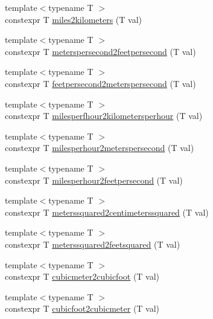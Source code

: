 \begin{DoxyCompactItemize}
\item 
{\footnotesize template$<$typename T $>$ }\\constexpr T \mbox{\hyperlink{namespacempc_1_1utilities_a458eadeb7c7c3bb539d2d1740789b4d3}{miles2kilometers}} (T val)
\item 
{\footnotesize template$<$typename T $>$ }\\constexpr T \mbox{\hyperlink{namespacempc_1_1utilities_a33bbcb9c7dbaf0c3a898ece6b9dc3c18}{meterspersecond2feetpersecond}} (T val)
\item 
{\footnotesize template$<$typename T $>$ }\\constexpr T \mbox{\hyperlink{namespacempc_1_1utilities_a828f7c56f37be383853827b0c3cc14df}{feetpersecond2meterspersecond}} (T val)
\item 
{\footnotesize template$<$typename T $>$ }\\constexpr T \mbox{\hyperlink{namespacempc_1_1utilities_af01ea239316f5eb90284cd5cf1f01919}{milesperfhour2kilometersperhour}} (T val)
\item 
{\footnotesize template$<$typename T $>$ }\\constexpr T \mbox{\hyperlink{namespacempc_1_1utilities_ab14e5cdfd57941629a121328c7971cc3}{milesperhour2meterspersecond}} (T val)
\item 
{\footnotesize template$<$typename T $>$ }\\constexpr T \mbox{\hyperlink{namespacempc_1_1utilities_aeca95aa677140f98a53ae3b5033ea892}{milesperhour2feetpersecond}} (T val)
\item 
{\footnotesize template$<$typename T $>$ }\\constexpr T \mbox{\hyperlink{namespacempc_1_1utilities_af5e0b246cdb2b38936454bc4406777cc}{meterssquared2centimeterssquared}} (T val)
\item 
{\footnotesize template$<$typename T $>$ }\\constexpr T \mbox{\hyperlink{namespacempc_1_1utilities_a28fae5a86f93cbc52ae411d49842dd85}{meterssquared2feetsquared}} (T val)
\item 
{\footnotesize template$<$typename T $>$ }\\constexpr T \mbox{\hyperlink{namespacempc_1_1utilities_ac73a70f3a631e074d3fc17b1df7e8d51}{cubicmeter2cubicfoot}} (T val)
\item 
{\footnotesize template$<$typename T $>$ }\\constexpr T \mbox{\hyperlink{namespacempc_1_1utilities_ad3d1fe7b84dc93ee23990c1f5eb06465}{cubicfoot2cubicmeter}} (T val)
\item 

\end{DoxyCompactItemize}
